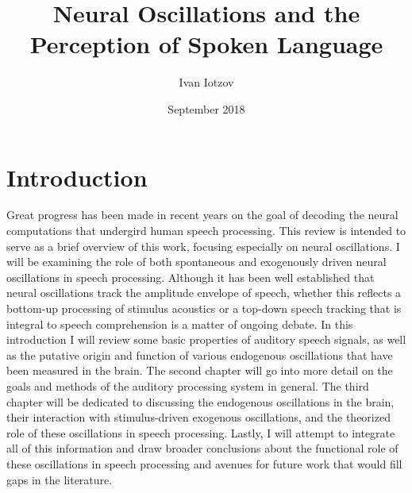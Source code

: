 \documentclass[titlepage]{article}
\title{Neural Oscillations and the \\ Perception of Spoken Language}
\author{Ivan Iotzov}
\date{September 2018}
\begin{document}

\maketitle


\section{Introduction} \label{intro}

  Great progress has been made in recent years on the goal
  of decoding the neural computations that undergird 
  human speech processing. This review is intended
  to serve as a brief overview of this work, focusing especially on 
  neural oscillations. I will be examining the role of
  both spontaneous and exogenously driven neural oscillations 
  in speech processing. Although it has been well established that 
  neural oscillations track the amplitude envelope of speech, whether this 
  reflects a bottom-up processing of stimulus acoustics or a top-down 
  speech tracking that is integral to speech comprehension is a matter 
  of ongoing debate. In this introduction I will review
  some basic properties of auditory speech signals, as well as the putative 
  origin and function of various endogenous oscillations that have been 
  measured in the brain. The second 
  chapter will go into more detail on the goals and methods of the auditory 
  processing system in general. The third chapter will be dedicated to 
  discussing the endogenous oscillations in the brain, their interaction with 
  stimulus-driven exogenous oscillations, and the theorized role of these 
  oscillations in speech processing. Lastly, I will attempt
  to integrate all of this information and draw broader conclusions about 
  the functional role of these oscillations in speech processing and avenues 
  for future work that would fill gaps in the literature.

\end{document}
